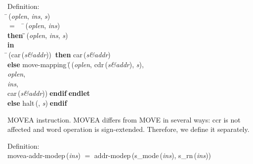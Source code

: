 \begin{tabbing}{\sc Definition}: \\  
\=\,({\it{oplen\/}}, {\it{ins\/}}, {\it{s\/}}) \\ 
$=$$\;\;\;\;$\=\,({\it{oplen\/}}, {\it{ins\/}}) \\ 
{\bf then }\=\=\,({\it{oplen\/}}, {\it{ins\/}}, {\it{s\/}})\- \\ 
{\bf in} \\ 
\=\,({\rm{car}}\,({\it{s\&addr\/}}))$\;\;${\bf then }{\rm{car}}\,({\it{s\&addr\/}}) \\ 
{\bf else }{\rm{move-mapping}}\,(\=\,({\it{oplen\/}}, {\rm{cdr}}\,({\it{s\&addr\/}}), {\it{s\/}}), \\ 
{\it{oplen\/}}, \\ 
{\it{ins\/}}, \\ 
{\rm{car}}\,({\it{s\&addr\/}}))\-$\;${\bf  endif}\-$\;${\bf  endlet}\- \\ 
{\bf else }{\rm{halt}}\,({}, {\it{s\/}})$\;${\bf  endif}\-\-
\end{tabbing}

 MOVEA instruction.
 MOVEA differs from MOVE in several ways:  ccr is not affected and word
 operation is sign-extended.  Therefore, we define it separately.
\begin{tabbing}{\sc Definition}: \\  
{\rm{movea-addr-modep}}\,({\it{ins\/}}) $=$ {\rm{addr-modep}}\,({\rm{s\_mode}}\,({\it{ins\/}}), {\rm{s\_rn}}\,({\it{ins\/}}))
\end{tabbing}

